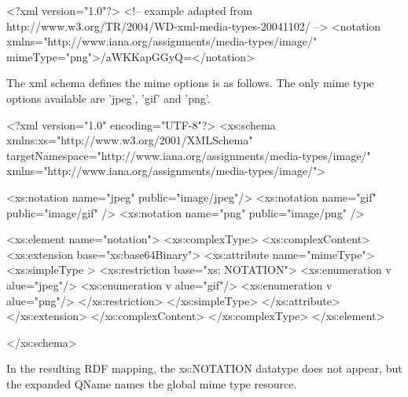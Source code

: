 \begin{DoxyCodeInclude}
<?xml version="1.0"?>
<!-- example adapted from http://www.w3.org/TR/2004/WD-xml-media-types-20041102/ 
      -->
<notation xmlns="http://www.iana.org/assignments/media-types/image/" 
        mimeType="png">/aWKKapGGyQ=</notation>
\end{DoxyCodeInclude}


The xml schema defines the mime options is as follows. The only mime type options available are 'jpeg', 'gif' and 'png'.


\begin{DoxyCodeInclude}
<?xml version="1.0" encoding="UTF-8"?>
<xs:schema xmlns:xs="http://www.w3.org/2001/XMLSchema" 
        targetNamespace="http://www.iana.org/assignments/media-types/image/" 
        xmlns="http://www.iana.org/assignments/media-types/image/">
                
        <xs:notation name="jpeg" public="image/jpeg"/>
        <xs:notation name="gif" public="image/gif" />
        <xs:notation name="png" public="image/png" />
        
        <xs:element name="notation">
                <xs:complexType>
                        <xs:complexContent>
                                <xs:extension base="xs:base64Binary">
                                        <xs:attribute name="mimeType">
                                                <xs:simpleType >
                                                        <xs:restriction base="xs:
      NOTATION">
                                                                <xs:enumeration v
      alue="jpeg"/>
                                                                <xs:enumeration v
      alue="gif"/>
                                                                <xs:enumeration v
      alue="png"/>
                                                        </xs:restriction>
                                                </xs:simpleType>
                                        </xs:attribute>
                                </xs:extension>
                        </xs:complexContent>
                </xs:complexType>
        </xs:element>

</xs:schema>
\end{DoxyCodeInclude}


In the resulting RDF mapping, the xs:NOTATION datatype does not appear, but the expanded QName names the global mime type resource.


